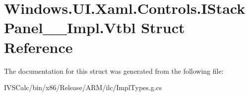 \hypertarget{struct_windows_1_1_u_i_1_1_xaml_1_1_controls_1_1_i_stack_panel_____impl_1_1_vtbl}{}\section{Windows.\+U\+I.\+Xaml.\+Controls.\+I\+Stack\+Panel\+\_\+\+\_\+\+Impl.\+Vtbl Struct Reference}
\label{struct_windows_1_1_u_i_1_1_xaml_1_1_controls_1_1_i_stack_panel_____impl_1_1_vtbl}


The documentation for this struct was generated from the following file\+:\begin{DoxyCompactItemize}
\item 
I\+V\+S\+Calc/bin/x86/\+Release/\+A\+R\+M/ilc/Impl\+Types.\+g.\+cs\end{DoxyCompactItemize}
